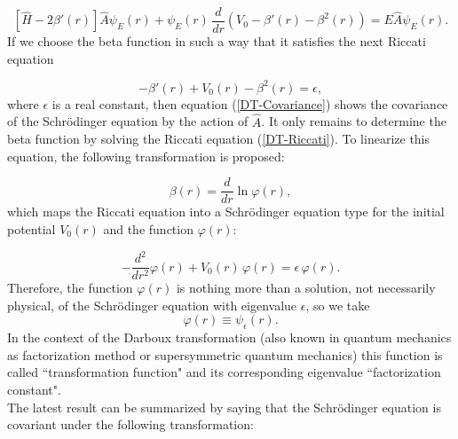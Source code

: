 \documentclass[a4paper]{jpconf}
\begin{document}
\begin{equation}
\left[\hat{H}-2\beta'(r)\right]\hat{A}\psi_E(r)+\psi_E(r)\,\frac{d}{dr}\left(V_0-\beta'(r)-\beta^2(r)\right)=E\hat{A}\psi_E(r).\label{DT-Covariance}
\end{equation}
If we choose the beta function in such a way that it satisfies the next Riccati equation

\begin{equation}
-\beta'(r)+V_0(r)-\beta^2(r)=\epsilon,\label{DT-Riccati}
\end{equation}
where $\epsilon$ is a real constant, then equation (\ref{DT-Covariance}) shows the covariance of the Schr\" odinger equation by the action of $\hat{A}$. It only remains to determine the beta function by solving the Riccati equation (\ref{DT-Riccati}). To linearize this equation, the following transformation is proposed:

\begin{equation}
\beta(r)=\frac{d}{dr}\ln{\varphi(r)},\label{DT-beta}
\end{equation}
which maps the Riccati equation into a Schr\" odinger equation type for the initial potential $V_0(r)$ and the function $\varphi(r)$:

\begin{equation}
-\frac{d^2}{dr^2}\varphi(r)+V_0(r)\,\varphi(r)=\epsilon\, \varphi(r).
\end{equation}
Therefore, the function $\varphi(r)$  is nothing more than a solution, not necessarily physical, of the Schr\" odinger equation with eigenvalue $\epsilon$, so we take 
\begin{equation}
\varphi(r)\equiv \psi_\epsilon(r).
\end{equation}
In the context of the Darboux transformation (also known in quantum mechanics as factorization method or supersymmetric quantum mechanics) this function is called ``transformation function" and its corresponding eigenvalue ``factorization constant". \\
The latest result can be summarized by saying that the Schr\" odinger equation is covariant under the following transformation:
\end{document}
